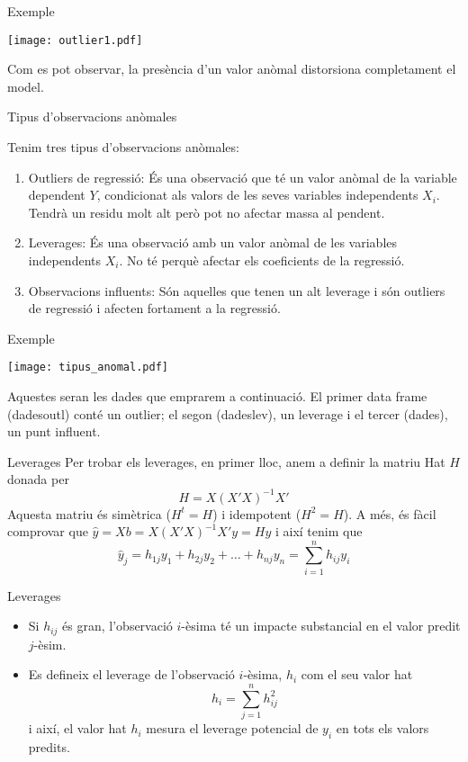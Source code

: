 \documentclass[12pt,t]{beamer}
\renewcommand{\emph}[1]{{\color{red}#1}}
\theoremstyle{plain}
\theoremstyle{definition}
\begin{document}
\begin{frame}{Exemple}
\begin{center}
\texttt{[image: outlier1.pdf]}
\end{center}

Com es pot observar, la presència d'un valor anòmal distorsiona completament el model.

\end{frame}

\begin{frame}{Tipus d'observacions anòmales}

Tenim tres tipus d'observacions anòmales:
\begin{enumerate}
\item \emph{Outliers de regressió}: És una observació que té un valor anòmal de la variable dependent $Y$, condicionat als valors de les seves variables independents $X_i$. Tendrà un residu molt alt però pot no afectar massa al pendent.
\item \emph{Leverages}: És una observació amb un valor anòmal de les variables independents $X_i$. No té perquè afectar els coeficients de la regressió.
\item \emph{Observacions influents}: Són aquelles que tenen un alt leverage i són outliers de regressió i afecten fortament a la regressió.

\end{enumerate}

\end{frame}

\begin{frame}{Exemple}

\begin{center}
\texttt{[image: tipus\_anomal.pdf]}
\end{center}
Aquestes seran les dades que emprarem a continuació. El primer data frame (dadesoutl) conté un outlier; el segon (dadeslev), un leverage i el tercer (dades), un punt influent.
\end{frame}

\begin{frame}{Leverages}
Per trobar els leverages, en primer lloc, anem a definir la \emph{ matriu Hat} $H$ donada per
$$H=X(X'X)^{-1}X'$$
Aquesta matriu és simètrica ($H^t=H$) i idempotent ($H^2=H$). A	més, és fàcil comprovar que $\hat{y}=Xb=X(X'X)^{-1}X'y=Hy$ i així tenim que
$$\hat{y}_{j}=h_{1j}y_1+h_{2j}y_2+\ldots+h_{nj}y_n=\sum_{i=1}^n{h_{ij}y_i}$$
\end{frame}

\begin{frame}{Leverages}

\begin{itemize}
\item Si $h_{ij}$ és gran, l'observació $i$-èsima té un impacte substancial en el valor predit $j$-èsim.
\medskip
\item Es defineix el \emph{leverage} de l'observació $i$-èsima, $h_i$ com el seu valor hat
$$h_i=\sum_{j=1}^n{h_{ij}^2}$$
i així, el valor hat $h_i$ mesura el leverage potencial de $y_i$ en tots els valors predits.
\end{itemize}

\end{frame}
\end{document}
